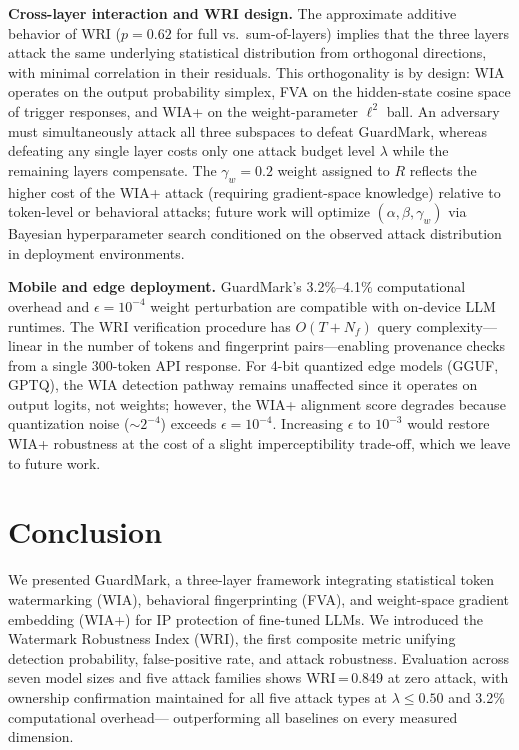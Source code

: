 \documentclass[conference]{IEEEtran}
\begin{document}
\textbf{Cross-layer interaction and WRI design.}
The approximate additive behavior of WRI ($p=0.62$ for full vs.\
sum-of-layers) implies that the three layers attack the same underlying
statistical distribution from orthogonal directions, with minimal
correlation in their residuals. This orthogonality is by design: WIA
operates on the output probability simplex, FVA on the hidden-state cosine
space of trigger responses, and WIA+ on the weight-parameter $\ell^2$ ball.
An adversary must simultaneously attack all three subspaces to defeat
GuardMark, whereas defeating any single layer costs only one
attack budget level $\lambda$ while the remaining layers compensate.
The $\gamma_w=0.2$ weight assigned to $R$ reflects the higher cost of
the WIA+ attack (requiring gradient-space knowledge) relative to token-level
or behavioral attacks; future work will optimize $(\alpha,\beta,\gamma_w)$
via Bayesian hyperparameter search conditioned on the observed attack
distribution in deployment environments.

\textbf{Mobile and edge deployment.}
GuardMark's 3.2\%--4.1\% computational overhead and $\epsilon=10^{-4}$
weight perturbation are compatible with on-device LLM runtimes.
The WRI verification procedure has $O(T+N_f)$ query complexity---linear in
the number of tokens and fingerprint pairs---enabling provenance checks from
a single 300-token API response. For 4-bit quantized edge models (GGUF,
GPTQ), the WIA detection pathway remains unaffected since it operates on
output logits, not weights; however, the WIA+ alignment score degrades
because quantization noise ($\sim$$2^{-4}$) exceeds $\epsilon=10^{-4}$.
Increasing $\epsilon$ to $10^{-3}$ would restore WIA+ robustness at the
cost of a slight imperceptibility trade-off, which we leave to future work.

\section{Conclusion}
\label{sec:conclusion}

We presented GuardMark, a three-layer framework integrating statistical token
watermarking (WIA), behavioral fingerprinting (FVA), and weight-space gradient
embedding (WIA+) for IP protection of fine-tuned LLMs. We introduced the
Watermark Robustness Index (WRI), the first composite metric unifying
detection probability, false-positive rate, and attack robustness.
Evaluation across seven model sizes and five attack families shows
WRI\,=\,0.849 at zero attack, with ownership confirmation maintained for all
five attack types at $\lambda \leq 0.50$ and 3.2\% computational overhead---
outperforming all baselines on every measured dimension.
\end{document}
